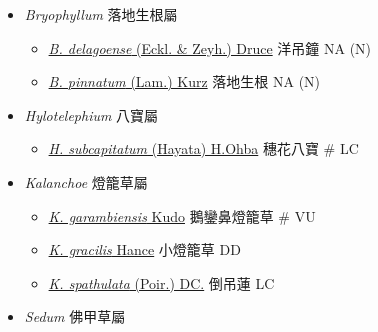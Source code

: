 
  \begin{itemize}
 \item[] \textit{Bryophyllum} 落地生根屬
                                
  \begin{itemize}
        \item[] \href{http://www.theplantlist.org/tpl1.1/search?q=Bryophyllum+delagoense}{\textit{B. delagoense} (Eckl. \& Zeyh.) Druce}   洋吊鐘   NA (N)
        \item[] \href{http://www.theplantlist.org/tpl1.1/search?q=Bryophyllum+pinnatum}{\textit{B. pinnatum} (Lam.) Kurz}   落地生根   NA (N)
  \end{itemize}
 \item[] \textit{Hylotelephium} 八寶屬
                                
  \begin{itemize}
        \item[] \href{http://www.theplantlist.org/tpl1.1/search?q=Hylotelephium+subcapitatum}{\textit{H. subcapitatum} (Hayata) H.Ohba}   穗花八寶  \# LC
  \end{itemize}
 \item[] \textit{Kalanchoe} 燈籠草屬
                                
  \begin{itemize}
        \item[] \href{http://www.theplantlist.org/tpl1.1/search?q=Kalanchoe+garambiensis}{\textit{K. garambiensis} Kudo}   鵝鑾鼻燈籠草  \# VU
        \item[] \href{http://www.theplantlist.org/tpl1.1/search?q=Kalanchoe+gracilis}{\textit{K. gracilis} Hance}   小燈籠草   DD
        \item[] \href{http://www.theplantlist.org/tpl1.1/search?q=Kalanchoe+spathulata}{\textit{K. spathulata} (Poir.) DC.}   倒吊蓮   LC
  \end{itemize}
 \item[] \textit{Sedum} 佛甲草屬
                                

\end{itemize}
